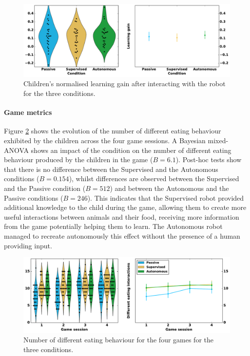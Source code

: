 \begin{figure}[ht]
	\includegraphics[width=1\linewidth]{learning.pdf}
	\centering
	\caption{Children's normalised learning gain after interacting with the robot for the three conditions.}
	\label{fig:learning}
\end{figure}

\paragraph{Game metrics}

Figure \ref{fig:d_eat} shows the evolution of the number of different eating behaviour exhibited by the children across the four game sessions. A Bayesian mixed-ANOVA shows an impact of the condition on the number of different eating behaviour produced by the children in the game ($B=6.1$). Post-hoc tests show that there is no difference between the Supervised and the Autonomous conditions ($B=0.154$), whilst differences are observed between the Supervised and the Passive condition ($B=512$) and between the Autonomous and the Passive conditions ($B=246$). This indicates that the Supervised robot provided additional knowledge to the child during the game, allowing them to create more useful interactions between animals and their food, receiving more information from the game potentially helping them to learn. The Autonomous robot managed to recreate autonomously this effect without the presence of a human providing input.

\begin{figure}[ht]
	\includegraphics[width=1\linewidth]{d_eat.pdf}
	\centering
	\caption{Number of different eating behaviour for the four games for the three conditions.}
	\label{fig:d_eat}
\end{figure}

